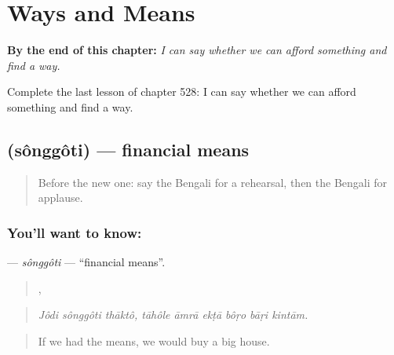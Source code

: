 
\chapter{Ways and Means}
\label{ch:bn-ways-and-means}

\begin{chapteropening}
\textbf{By the end of this chapter:} \emph{I can say whether we can afford something and find a way.}

Complete the last lesson of chapter 528: I can say whether we can afford something and find a way.
\end{chapteropening}

\section[\texorpdfstring{\bn{সঙ্গতি} (sônggôti)}{সঙ্গতি (sônggôti)}]{ (sônggôti) — financial means}

\label{lesson:BN-C528-songgoti}



\begin{quote}
Before the new one: say the Bengali for a rehearsal, then the Bengali for applause.
\end{quote}

\subsection*{You'll want to know: }
\textbf{} — \emph{sônggôti} — \textquotedblleft{}financial means\textquotedblright{}.

\begin{quote}
  ,      
\end{quote}

\begin{quote}
\emph{Jôdi sônggôti thāktô, tāhôle āmrā ekṭā bôṛo bāṛi kintām.}
\end{quote}

\begin{quote}
If we had the means, we would buy a big house.
\end{quote}


